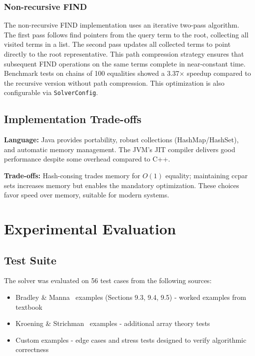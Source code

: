 \documentclass[11pt,a4paper]{article}
\begin{document}
\subsubsection{Non-recursive FIND}

The non-recursive FIND implementation uses an iterative two-pass algorithm. The first pass follows find pointers from the query term to the root, collecting all visited terms in a list. The second pass updates all collected terms to point directly to the root representative. This path compression strategy ensures that subsequent FIND operations on the same terms complete in near-constant time. Benchmark tests on chains of 100 equalities showed a 3.37× speedup compared to the recursive version without path compression. This optimization is also configurable via \texttt{SolverConfig}.

\subsection{Implementation Trade-offs}

\textbf{Language:} Java provides portability, robust collections (HashMap/HashSet), and automatic memory management. The JVM's JIT compiler delivers good performance despite some overhead compared to C++.

\textbf{Trade-offs:} Hash-consing trades memory for $O(1)$ equality; maintaining ccpar sets increases memory but enables the mandatory optimization. These choices favor speed over memory, suitable for modern systems.

\section{Experimental Evaluation}

\subsection{Test Suite}

The solver was evaluated on 56 test cases from the following sources:
\begin{itemize}[leftmargin=*]
    \item Bradley \& Manna~\cite{bradley2007calculus} examples (Sections 9.3, 9.4, 9.5) - worked examples from textbook
    \item Kroening \& Strichman~\cite{kroening2008decision} examples - additional array theory tests
    \item Custom examples - edge cases and stress tests designed to verify algorithmic correctness
\end{itemize}
\end{document}

